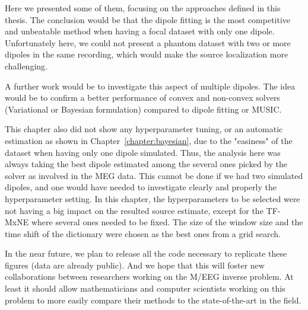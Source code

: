 Here we presented some of them, focusing on the approaches defined in this thesis. The conclusion would be that the dipole fitting is the most competitive and unbeatable method when having a focal dataset with only one dipole. Unfortunately here, we could not present a phantom dataset with two or more dipoles in the same recording, which would make the source localization more challenging.

A further work would be to investigate this aspect of multiple dipoles. The idea would be to confirm a better performance of convex and non-convex solvers (Variational or Bayesian formulation) compared to dipole fitting or MUSIC.

This chapter also did not show any hyperparameter tuning, or an automatic estimation as shown in Chapter~\ref{chapter:bayesian}, due to the "easiness" of the dataset when having only one dipole simulated. Thus, the analysis here was always taking the best dipole estimated among the several ones picked by the solver as involved in the MEG data. This cannot be done if we had two simulated dipoles, and one would have needed to investigate clearly and properly the hyperparameter setting. In this chapter, the hyperparameters to be selected were not having a big impact on the resulted source estimate, except for the TF-MxNE where several ones needed to be fixed. The size of the window size and the time shift of the dictionary were chosen as the best ones from a grid search.

In the near future, we plan to release all the code necessary to replicate these figures (data are already public).
And we hope that this will foster new collaborations between researchers working on the M/EEG inverse problem. At least
it should allow mathematicians and computer scientists working on this problem to more easily compare their methods
to the state-of-the-art in the field.
